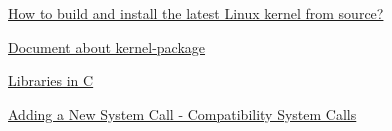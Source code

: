 \documentclass[a4paper]{article}
\author{Huỳnh Sâm Hà - 1610852@hcmut.edu.vn}
\begin{document}


\newpage \thispagestyle{empty} \tableofcontents

\newpage

\setlength\parindent{0pt}


%
%
%

\newpage


\begin{thebibliography}{99999}
	
 {
\href{https://medium.freecodecamp.org/building-and-installing-the-latest-linux-kernel-from-source-6d8df5345980}{How to build and install the latest Linux kernel from source?}}
	
 {
	\href{http://man.he.net/man5/kernel-package}{Document about kernel-package}}

 {
	\href{https://www.cs.swarthmore.edu/~newhall/unixhelp/howto_C_libraries.html}{Libraries in C}}


 {
	\href{https://www.kernel.org/doc/html/v4.12/process/adding-syscalls.html#x86-system-call-implementation}{Adding a New System Call - Compatibility System Calls}}


\end{thebibliography}



 
\end{document}
